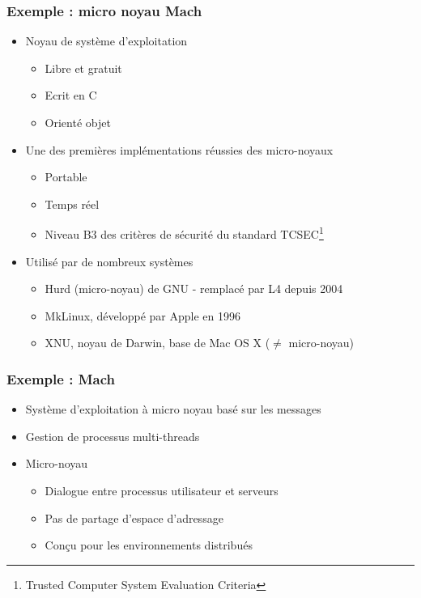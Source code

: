 \begin{frame}
\frametitle{Exemple : micro noyau Mach}
\begin{itemize}
\item Noyau de système d'exploitation
\begin{itemize}
\item Libre et gratuit
\item Ecrit en C
\item Orienté objet
\end{itemize}
\item Une des premières implémentations réussies des micro-noyaux
\begin{itemize}
\item Portable
\item Temps réel
\item Niveau B3 des critères de sécurité du standard TCSEC\footnote{Trusted Computer System Evaluation Criteria}
\end{itemize}
\item Utilisé par de nombreux systèmes
\begin{itemize}
\item Hurd (micro-noyau) de GNU - remplacé par L4 depuis 2004
\item MkLinux, développé par Apple en 1996
\item XNU, noyau de Darwin, base de Mac OS X ($\ne$ micro-noyau)
\end{itemize}

\end{itemize}
\end{frame}

\begin{frame}
\frametitle{Exemple : Mach}
\begin{itemize}
\item Système d’exploitation à micro noyau basé sur les messages
\item Gestion de processus multi-threads
\item Micro-noyau
\begin{itemize}
\item Dialogue entre processus utilisateur et serveurs
\item Pas de partage d’espace d’adressage
\item Conçu pour les environnements distribués
\end{itemize}
\end{itemize}
\end{frame}

